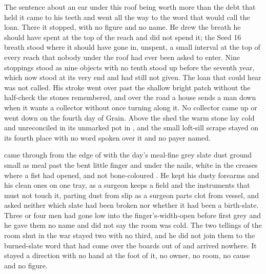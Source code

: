 The sentence about an ear under this roof being worth more than the debt that held it came to his teeth and went all the way to the word that would call the loan. There it stopped, with no figure and no name. He drew the breath he should have spent at the top of the reach and did not spend it; the Seed 16 breath stood where it should have gone in, unspent, a small interval at the top of every reach that nobody under the roof had ever been asked to enter. Nine stoppings stood as nine objects with no tenth stood up before the seventh year, which now stood at its very end and had still not given. The loan that could hear was not called. His stroke went over  past the shallow bright patch without the half-check the stones remembered, and over the road a house sends a man down when it wants a collector without once turning along it. No collector came up or went down  on the fourth day of Grain. Above the shed the warm stone lay cold and unreconciled in its unmarked pot in , and the small loft-sill scrape stayed on its fourth place with no word spoken over it and no payer named.

\scenebreak

 came through from the edge of  with the day's meal-fine grey slate dust ground small as meal past the bent little finger and under the nails, white in the creases where a fist had opened, and not bone-coloured . He kept his dusty forearms and his clean ones on one tray, as a surgeon keeps a field and the instruments that must not touch it, parting dust from slip as a surgeon parts clot from vessel, and asked neither which slate had been broken nor whether it had been a birth-slate. Three or four men had gone low into the finger's-width-open  before first grey and he gave them no name and did not say the room was cold. The two tellings of the room shut in the war stayed two with no third, and he did not join them to the burned-slate word that had come over the boards out of  and arrived nowhere. It stayed a direction with no hand at the foot of it, no owner, no room, no cause and no figure.

